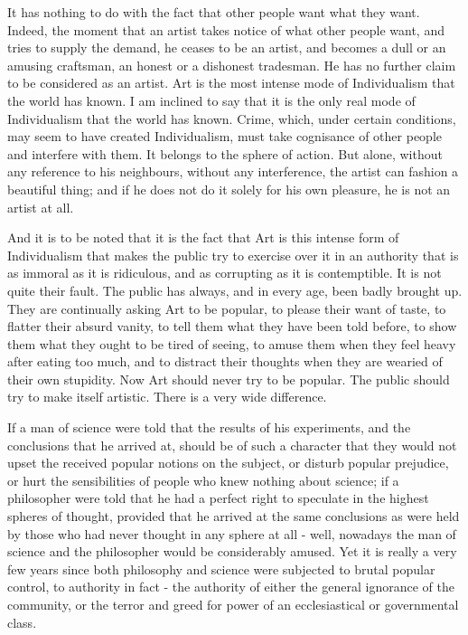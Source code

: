 It has nothing to do with the fact that other people want what they want. Indeed, the moment that an artist takes notice of what other people want, and tries to supply the demand, he ceases to be an artist, and becomes a dull or an amusing craftsman, an honest or a dishonest tradesman. He has no further claim to be considered as an artist. Art is the most intense mode of Individualism that the world has known. I am inclined to say that it is the only real mode of Individualism that the world has known. Crime, which, under certain conditions, may seem to have created Individualism, must take cognisance of other people and interfere with them. It belongs to the sphere of action. But alone, without any reference to his neighbours, without any interference, the artist can fashion a beautiful thing; and if he does not do it solely for his own pleasure, he is not an artist at all.\par

And it is to be noted that it is the fact that Art is this intense form of Individualism that makes the public try to exercise over it in an authority that is as immoral as it is ridiculous, and as corrupting as it is contemptible. It is not quite their fault. The public has always, and in every age, been badly brought up. They are continually asking Art to be popular, to please their want of taste, to flatter their absurd vanity, to tell them what they have been told before, to show them what they ought to be tired of seeing, to amuse them when they feel heavy after eating too much, and to distract their thoughts when they are wearied of their own stupidity. Now Art should never try to be popular. The public should try to make itself artistic. There is a very wide difference.\par

If a man of science were told that the results of his experiments, and the conclusions that he arrived at, should be of such a character that they would not upset the received popular notions on the subject, or disturb popular prejudice, or hurt the sensibilities of people who knew nothing about science; if a philosopher were told that he had a perfect right to speculate in the highest spheres of thought, provided that he arrived at the same conclusions as were held by those who had never thought in any sphere at all - well, nowadays the man of science and the philosopher would be considerably amused. Yet it is really a very few years since both philosophy and science were subjected to brutal popular control, to authority in fact - the authority of either the general ignorance of the community, or the terror and greed for power of an ecclesiastical or governmental class.\par

